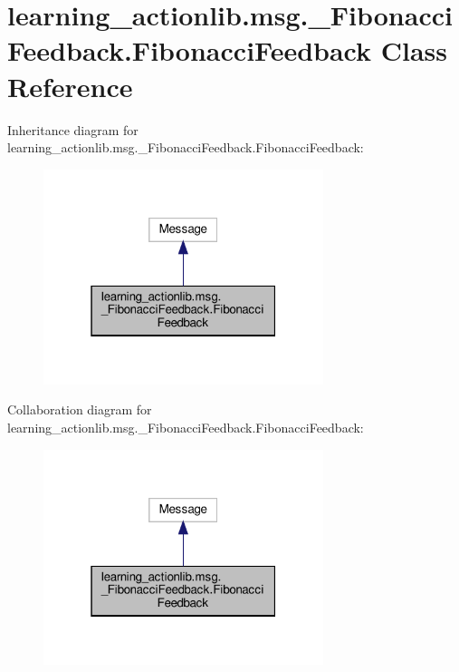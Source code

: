 \hypertarget{classlearning__actionlib_1_1msg_1_1__FibonacciFeedback_1_1FibonacciFeedback}{}\section{learning\+\_\+actionlib.\+msg.\+\_\+\+Fibonacci\+Feedback.\+Fibonacci\+Feedback Class Reference}
\label{classlearning__actionlib_1_1msg_1_1__FibonacciFeedback_1_1FibonacciFeedback}


Inheritance diagram for learning\+\_\+actionlib.\+msg.\+\_\+\+Fibonacci\+Feedback.\+Fibonacci\+Feedback\+:
\nopagebreak
\begin{figure}[H]
\begin{center}
\leavevmode
\includegraphics[width=232pt]{classlearning__actionlib_1_1msg_1_1__FibonacciFeedback_1_1FibonacciFeedback__inherit__graph}
\end{center}
\end{figure}


Collaboration diagram for learning\+\_\+actionlib.\+msg.\+\_\+\+Fibonacci\+Feedback.\+Fibonacci\+Feedback\+:
\nopagebreak
\begin{figure}[H]
\begin{center}
\leavevmode
\includegraphics[width=232pt]{classlearning__actionlib_1_1msg_1_1__FibonacciFeedback_1_1FibonacciFeedback__coll__graph}
\end{center}
\end{figure}
